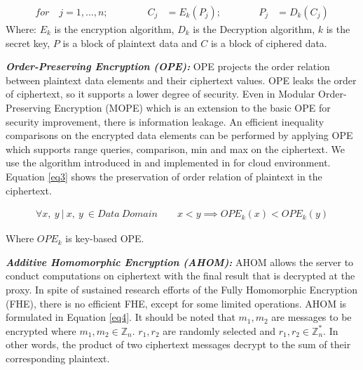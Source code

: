 \begin{equation} \label{eq2}
\begin{aligned}
for \quad j=1, \ldots, n ; \qquad \qquad C_j & = E_k(P_j); \qquad \quad 
& P_j & = D_k(C_j) 
\end{aligned}
\end{equation}
\normalsize Where: $E_k$ is the encryption algorithm, $D_k$ is the Decryption algorithm, $k$ is the secret key, $P$ is a block of plaintext data and $C$ is a block of ciphered data.


\normalsize

\medskip

\noindent \textbf{\textit{Order-Preserving Encryption (OPE):}} OPE projects the order relation between plaintext data elements and their ciphertext values. OPE leaks the order of ciphertext, so it supports a lower degree of security. Even in Modular Order-Preserving Encryption (MOPE) \cite{Mavroforakis:2015:MOE:2723372.2749455} which is an extension to the basic OPE for security improvement, there is information leakage. An efficient inequality comparisons on the encrypted data elements can be performed by applying OPE which supports range queries, comparison, min and max on the ciphertext. We use the algorithm introduced in \cite{boldyreva2009order} and implemented in \cite{ahmadian2014security} for cloud environment. Equation \ref{eq3} shows the preservation of order relation of plaintext in the ciphertext.

\begin{equation} \label{eq3}
\begin{aligned}
\forall x, ~y ~|~ x,~y~ \in {Data~ Domain} \qquad x < y \implies OPE_k(x) < OPE_k(y)
\end{aligned}
\end{equation}

\normalsize Where $OPE_k$ is key-based OPE.


\medskip 

\noindent \textbf{\textit{Additive Homomorphic Encryption (AHOM):}} AHOM allows the server to conduct computations on ciphertext with the final result that is decrypted at the proxy. In spite of sustained research efforts \cite{gentry2009fully, brakerski2014efficient} of the Fully Homomorphic Encryption (FHE), there is no efficient FHE, except for some limited operations. AHOM is formulated in Equation \ref{eq4}. It should be noted that $m_1, m_2$ are messages to be encrypted where $m_1 , m_2 \in \mathbb Z_{n}$. $r_1, r_2$ are randomly selected and $r_1, r_2 \in \mathbb Z^{*}_{n}$. In other words, the product of two ciphertext messages decrypt to the sum of their corresponding plaintext.

